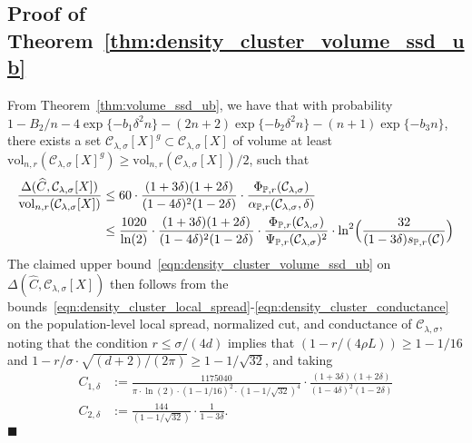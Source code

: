 \documentclass[twoside,11pt]{article}
\newcommand{\1}{\mathbf{1}}
\newcommand{\mc}[1]{\mathcal{#1}}
\newcommand{\Pbb}{\mathbb{P}}
\newcommand{\wh}[1]{\widehat{#1}}
\newcommand{\vol}{\mathrm{vol}}
\newcommand{\qed}{\hfill $\blacksquare$}
\begin{document}
\subsection{Proof of Theorem~\ref{thm:density_cluster_volume_ssd_ub}}
From Theorem~\ref{thm:volume_ssd_ub}, we have that with probability $1 - B_2/n - 4\exp\{-b_1\delta^2n\} - (2n + 2)\exp\{-b_2\delta^2n\} - (n + 1)\exp\{-b_3n\}$, there exists a set $\mc{C}_{\lambda,\sigma}[X]^g \subset \mc{C}_{\lambda,\sigma}[X]$ of volume at least $\vol_{n,r}(\mc{C}_{\lambda,\sigma}[X]^g) \geq \vol_{n,r}(\mc{C}_{\lambda,\sigma}[X])/2$, such that
\begin{align*}
\frac{\Delta(\wh{C},\mc{C}_{\lambda,\sigma}[X])}{\vol_{n,r}(\mc{C}_{\lambda,\sigma}[X])} & \leq 60 \cdot \frac{(1 + 3\delta)(1 + 2\delta)}{(1 - 4\delta)^2(1 - 2\delta)} \cdot \frac{\Phi_{\Pbb,r}(\mc{C}_{\lambda,\sigma})}{\alpha_{\Pbb,r}(\mc{C}_{\lambda,\sigma},\delta)} \\
& \leq \frac{1020}{\ln(2)} \cdot \frac{(1 + 3\delta)(1 + 2\delta)}{(1 - 4\delta)^2(1 - 2\delta)} \cdot \frac{\Phi_{\Pbb,r}(\mc{C}_{\lambda,\sigma})}{\Psi_{\Pbb,r}(\mc{C}_{\lambda,\sigma})^2} \cdot \ln^2\Bigl(\frac{32}{(1 - 3\delta) s_{\Pbb,r}(\mc{C})}\Bigr)
\end{align*}
The claimed upper bound~\eqref{eqn:density_cluster_volume_ssd_ub} on $\Delta(\wh{C},\mc{C}_{\lambda,\sigma}[X])$ then follows from the bounds~\eqref{eqn:density_cluster_local_spread}-\eqref{eqn:density_cluster_conductance} on the population-level local spread, normalized cut, and conductance of $\mc{C}_{\lambda,\sigma}$, noting that the condition $r \leq \sigma/(4d)$ implies that $(1 - r/(4\rho L)) \geq 1 - 1/16$ and $1 - r/\sigma \cdot \sqrt{(d + 2)/(2\pi)} \geq 1 - 1/\sqrt{32}$, and taking
\begin{align*}
C_{1,\delta} & := \frac{1175040}{\pi \cdot \ln(2) \cdot (1 - 1/16)^2 \cdot (1 - 1/\sqrt{32})^4} \cdot \frac{(1 + 3\delta)(1 + 2\delta)}{(1 - 4\delta)^2(1 - 2\delta)}\\
C_{2,\delta} & := \frac{144}{(1 - 1/\sqrt{32})} \cdot \frac{1}{1-3\delta}.
\end{align*} \qed
\end{document}
